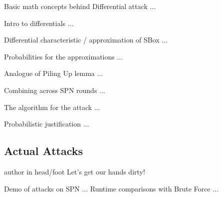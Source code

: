 \documentclass[9pt]{beamer}
\begin{document}
\begin{frame}
Basic math concepts behind Differential attack ...

\end{frame}

\begin{frame}
Intro to differentials ...

\end{frame}

\begin{frame}
Differential characteristic / approximation of SBox ...

\end{frame}

\begin{frame}
Probabilities for the approximations ...

\end{frame}

\begin{frame}
Analogue of Piling Up lemma ...

\end{frame}

\begin{frame}
Combining across SPN rounds ...

\end{frame}

\begin{frame}
The algorithm for the attack ...

\end{frame}

\begin{frame}
Probabilistic justification ...

\end{frame}

\subsection{Actual Attacks}
\begin{frame}
\begin{beamercolorbox}[ht=2.5ex,dp=1.125ex,center,rounded=true,shadow=true]{author in head/foot}
Let's get our hands dirty!
\end{beamercolorbox}
\end{frame}

\begin{frame}
Demo of attacks on SPN ... Runtime comparisons with Brute Force ...

\end{frame}
\end{document}
